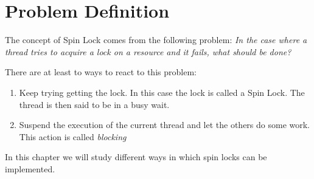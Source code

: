 \section{Problem Definition}
The concept of Spin Lock comes from the following problem: \textit{In the case where a thread tries to acquire a lock on a resource and it fails, what should be done?}
\par
There are at least to ways to react to this problem:
\begin{enumerate}
\item Keep trying getting the lock. In this case the lock is called a Spin Lock. The thread is then said to be in a busy wait.
\item Suspend the execution of the current thread and let the others do some work. This action is called \textit{blocking}
\end{enumerate}
\par
In this chapter we will study different ways in which spin locks can be implemented.